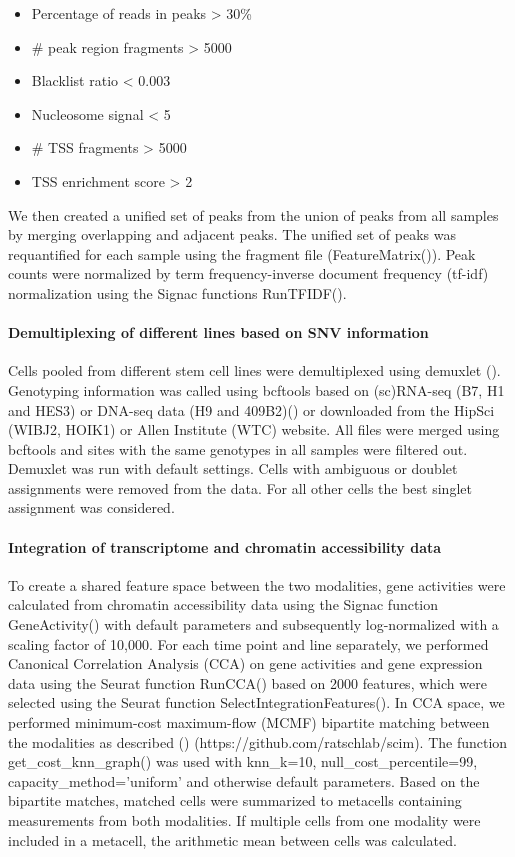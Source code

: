 \begin{itemize}
\item Percentage of reads in peaks > 30\% \
\item \# peak region fragments > 5000 \
\item Blacklist ratio < 0.003 \
\item Nucleosome signal < 5 \
\item \# TSS fragments > 5000 \
\item TSS enrichment score > 2 
\end{itemize} 

We then created a unified set of peaks from the union of peaks from all samples by merging overlapping and adjacent peaks. The unified set of peaks was requantified for each sample using the fragment file (FeatureMatrix()). Peak counts were normalized by term frequency-inverse document frequency (tf-idf) normalization using the Signac functions RunTFIDF().
 
\paragraph{Demultiplexing of different lines based on SNV information}
Cells pooled from different stem cell lines were demultiplexed using demuxlet (\cite{kang_multiplexed_2018}). Genotyping information was called using bcftools based on (sc)RNA-seq (B7, H1 and HES3) or DNA-seq data (H9 and 409B2)(\cite{riesenberg_simultaneous_2019,kanton_organoid_2019}) or downloaded from the HipSci (WIBJ2, HOIK1) or Allen Institute (WTC) website. All files were merged using bcftools and sites with the same genotypes in all samples were filtered out. Demuxlet was run with default settings. Cells with ambiguous or doublet assignments were removed from the data. For all other cells the best singlet assignment was considered.
 
\paragraph{Integration of transcriptome and chromatin accessibility data}
To create a shared feature space between the two modalities, gene activities were calculated from chromatin accessibility data using the Signac function GeneActivity() with default parameters and subsequently log-normalized with a scaling factor of 10,000. For each time point and line separately, we performed Canonical Correlation Analysis (CCA) on gene activities and gene expression data using the Seurat function RunCCA() based on 2000 features, which were selected using the Seurat function SelectIntegrationFeatures(). In CCA space, we performed minimum-cost maximum-flow (MCMF) bipartite matching between the modalities as described (\cite{stark_scim_2020}) (https://github.com/ratschlab/scim). The function get\_cost\_knn\_graph() was used with knn\_k=10, null\_cost\_percentile=99, capacity\_method='uniform' and otherwise default parameters. Based on the bipartite matches, matched cells were summarized to metacells containing measurements from both modalities. If multiple cells from one modality were included in a metacell, the arithmetic mean between cells was calculated.
 
